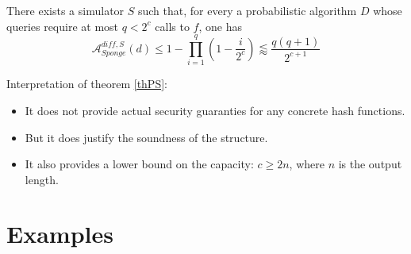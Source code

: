 	\begin{theorem}\label{thPS}
		There exists a simulator $S$ such that, for every a probabilistic algorithm $D$ whose queries require at most $q < 2^c$ calls to $f$, one has
		$$\mathcal{A}_{Sponge}^{diff,S}(d) \leq 1 - \prod\limits_{i=1}^q (1 - \frac{i}{2^c}) \lessapprox \frac{q(q+1)}{2^{c+1}}$$
	\end{theorem}
	
	Interpretation of theorem \ref{thPS}:
	\begin{itemize}
	    \item It does not provide actual security guaranties for any concrete hash functions.
	    \item But it does justify the soundness of the structure.
	    \item It also provides a lower bound on the capacity: $c \geq 2n$, where $n$ is the output length.
	\end{itemize}

\section{Examples}
